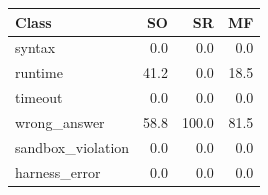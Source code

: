 \begin{tabular}{@{}lrrr@{}}
\toprule
Class & SO & SR & MF \\
\midrule
syntax & 0.0 & 0.0 & 0.0 \\
runtime & 41.2 & 0.0 & 18.5 \\
timeout & 0.0 & 0.0 & 0.0 \\
wrong\_answer & 58.8 & 100.0 & 81.5 \\
sandbox\_violation & 0.0 & 0.0 & 0.0 \\
harness\_error & 0.0 & 0.0 & 0.0 \\
\bottomrule
\end{tabular}
